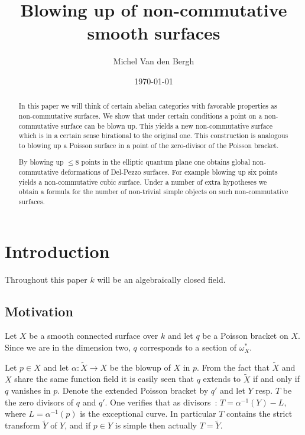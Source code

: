 \documentclass{amsproc}
\date{\today}
\title[Non-commutative blowing up]{Blowing up 
of non-commutative smooth surfaces}
\author{Michel Van den Bergh}
\def\r{\rightarrow}
\theoremstyle{definition}
\theoremstyle{remark}
\numberwithin{equation}{section}
\numberwithin{table}{section}
\numberwithin{figure}{section}
\begin{document}
 \begin{abstract}
   In this paper we will think of certain abelian categories with
   favorable properties as non-commutative surfaces.
   We show that under certain conditions a point on a
   non-commutative surface can be blown up. This yields a new
   non-commutative surface which is in a certain sense birational to
   the original one.  This construction is analogous to blowing up
   a Poisson surface in a point of the zero-divisor of the Poisson
   bracket.  
   
   By blowing up $\le 8$ points in the elliptic quantum plane one
   obtains global non-commutative deformations of Del-Pezzo surfaces.
   For example blowing up six points yields a non-commutative cubic
   surface.  Under a number of extra hypotheses we obtain a formula for
   the number of non-trivial simple objects on such non-commutative
   surfaces.
\end{abstract}
\maketitle
\tableofcontents
%
\section{Introduction}
\label{ref:1a}
Throughout this paper $k$ will be an algebraically closed field. \subsection{Motivation}
Let $X$
be a smooth connected surface over $k$ and let $q$ be a
Poisson bracket on $X$. Since we are in the dimension two, $q$ corresponds
to a section of $\omega_X^\ast$. 

Let $p\in X$ and let $\alpha:\tilde{X}\r X$  be the blowup of $X$ in $p$.
From the fact that  $\tilde{X}$ and $X$ share the same function field it is easily
seen that  $q$ extends
to $\tilde{X}$ if and only if $q$ vanishes in $p$. Denote the extended Poisson
bracket by $q'$ and let $Y$ resp. $T$ be the zero divisors of $q$ and
$q'$.
One verifies that as divisors~:
$T=\alpha^{-1}(Y)-L$, where $L=\alpha^{-1}(p)$ is the exceptional curve.
In particular  $T$ contains the strict transform $\tilde{Y}$ of $Y$, and if
$p\in Y$ is simple then actually $T=\tilde{Y}$.
\end{document}
